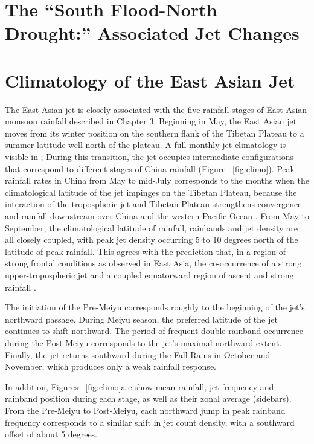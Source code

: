 \section{The ``South Flood-North Drought:'' Associated Jet Changes}

\section{Climatology of the East Asian Jet}

	The East Asian jet is closely associated with the five rainfall stages of East Asian monsoon rainfall described in Chapter 3. Beginning in May, the East Asian jet moves from its winter position on the southern flank of the Tibetan Plateau to a summer latitude well north of the plateau.  A full monthly jet climatology is visible in \citet{Schiemann2009}; During this transition, the jet occupies intermediate configurations that correspond to different stages of China rainfall (Figure ~\ref{fig:climo}). Peak rainfall rates in China from May to mid-July corresponds to the months when the climatological latitude of the jet impinges on the Tibetan Plateau, because the interaction of the tropospheric jet and Tibetan Plateau strengthens convergence and rainfall downstream over China and the western Pacific Ocean \citep{Molnar2010,Sampe2010,Chen2014}. From May to September,  the climatological latitude of rainfall, rainbands and jet density are all closely coupled, with peak jet density occurring 5 to 10 degrees north of the latitude of peak rainfall. This agrees with the prediction that, in a region of strong frontal conditions as observed in East Asia, the co-occurrence of a strong upper-tropospheric jet and a coupled equatorward region of ascent and strong rainfall \citep{Holton2004}. 
	
	The initiation of the Pre-Meiyu corresponds roughly to the beginning of the jet's northward passage. During Meiyu season, the preferred latitude of the jet continues to shift northward. The period of frequent double rainband occurrence during the Post-Meiyu corresponds to the jet's maximal northward extent. Finally, the jet returns southward during the Fall Rains in October and November, which produces only a weak rainfall response.
	
	In addition, Figures ~\ref{fig:climo}a-e show mean rainfall, jet frequency and rainband position during each stage, as well as their zonal average (sidebars). From the Pre-Meiyu to Post-Meiyu, each northward jump in peak rainband frequency corresponds to a similar shift in jet count density, with a southward offset of about 5 degrees.
	

